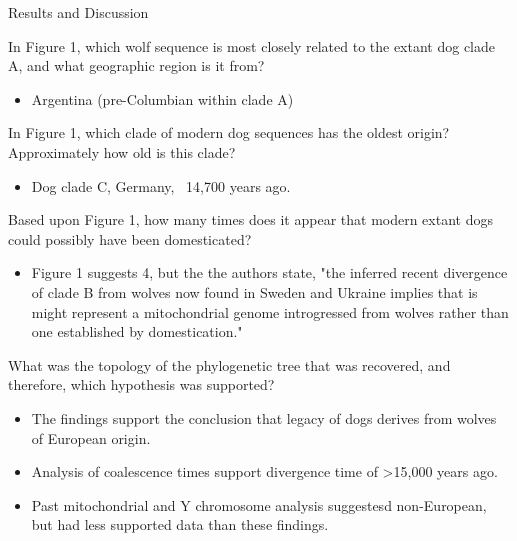 \documentclass[12pt,a4paper]{article}
\begin{document}
\begin{itemize}
\begin{itemize}
\begin{itemize}
                \end{itemize}
        \end{itemize}
    \item Results and Discussion
        \begin{itemize}
            {\color{darklc} \item In Figure 1, which wolf sequence is most closely related to the extant dog clade A, and what geographic region is it from?}
                \begin{itemize}
                    \item Argentina (pre-Columbian within clade A)
                \end{itemize}
            {\color{darklc} \item In Figure 1, which clade of modern dog sequences has the oldest origin? Approximately how old is this clade?}
                \begin{itemize}
                    \item Dog clade C, Germany, ~14,700 years ago.
                \end{itemize}
            {\color{darklc} \item Based upon Figure 1, how many times does it appear that modern extant dogs could possibly have been domesticated?}
                \begin{itemize}
                    \item Figure 1 suggests 4, but the the authors state, {\color{G-Moon}"the inferred recent divergence of clade B from wolves now found in Sweden and Ukraine implies that is might represent a mitochondrial genome introgressed from wolves rather than one established by domestication."}
                \end{itemize}
            {\color{darklc} \item What was the topology of the phylogenetic tree that was recovered, and therefore, which hypothesis was supported?}
                \begin{itemize}
                    \item The findings support the conclusion that legacy of dogs derives from wolves of European origin.
                    \item Analysis of coalescence times support divergence time of >15,000 years ago.
                    \item Past mitochondrial and Y chromosome analysis suggestesd non-European, but had less supported data than these findings.
                \end{itemize}

\end{itemize}
\end{itemize}
\end{document}
